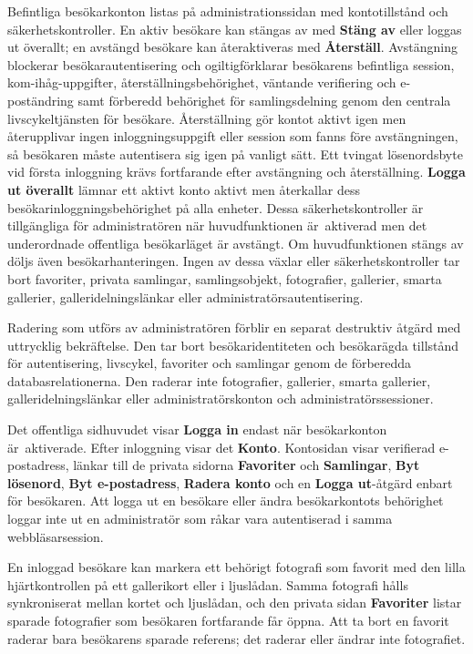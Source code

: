 \documentclass[11pt,a4paper]{article}
\newcommand{\ui}[1]{\textbf{#1}}
\begin{document}
Befintliga besökarkonton listas på administrationssidan med kontotillstånd och
säkerhetskontroller. En aktiv besökare kan stängas av med \ui{Stäng av} eller
loggas ut överallt; en avstängd besökare kan återaktiveras med \ui{Återställ}.
Avstängning blockerar besökarautentisering och ogiltigförklarar besökarens
befintliga session, kom-ihåg-uppgifter, återställningsbehörighet, väntande
verifiering och e-poständring samt förberedd behörighet för samlingsdelning
genom den centrala livscykeltjänsten för besökare. Återställning gör kontot
aktivt igen men återupplivar ingen inloggningsuppgift eller session som fanns
före avstängningen, så besökaren måste autentisera sig igen på vanligt sätt. Ett
tvingat lösenordsbyte vid första inloggning krävs fortfarande efter avstängning
och återställning. \ui{Logga ut överallt} lämnar ett aktivt konto aktivt men
återkallar dess besökarinloggningsbehörighet på alla enheter. Dessa
säkerhetskontroller är tillgängliga för administratören när huvudfunktionen
är~aktiverad men det underordnade offentliga besökarläget är avstängt. Om
huvudfunktionen stängs av döljs även besökarhanteringen. Ingen av dessa växlar
eller säkerhetskontroller tar bort favoriter, privata samlingar, samlingsobjekt,
fotografier, gallerier, smarta gallerier, galleridelningslänkar eller
administratörsautentisering.

Radering som utförs av administratören förblir en separat destruktiv åtgärd med
uttrycklig bekräftelse. Den tar bort besökaridentiteten och besökarägda
tillstånd för autentisering, livscykel, favoriter och samlingar genom de
förberedda databasrelationerna. Den raderar inte fotografier, gallerier, smarta
gallerier, galleridelningslänkar eller administratörskonton och
administratörssessioner.

Det offentliga sidhuvudet visar \ui{Logga in} endast när besökarkonton
är~aktiverade. Efter inloggning visar det \ui{Konto}. Kontosidan visar
verifierad e-postadress, länkar till de privata sidorna \ui{Favoriter} och
\ui{Samlingar}, \ui{Byt lösenord}, \ui{Byt e-postadress}, \ui{Radera konto} och
en \ui{Logga ut}-åtgärd enbart för besökaren. Att logga ut en besökare eller
ändra besökarkontots behörighet loggar inte ut en administratör som råkar vara
autentiserad i samma webbläsarsession.

En inloggad besökare kan markera ett behörigt fotografi som favorit med den
lilla hjärtkontrollen på ett gallerikort eller i ljuslådan. Samma fotografi
hålls synkroniserat mellan kortet och ljuslådan, och den privata sidan
\ui{Favoriter} listar sparade fotografier som besökaren fortfarande får öppna.
Att ta bort en favorit raderar bara besökarens sparade referens; det raderar
eller ändrar inte fotografiet.
\end{document}
